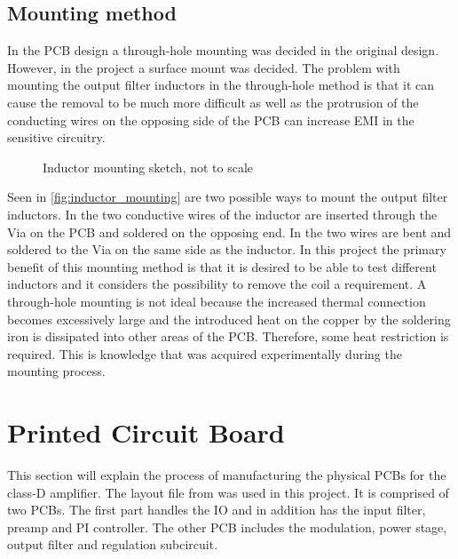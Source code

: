 \subsection{Mounting method}
In the PCB design a through-hole mounting was decided in the original design. However, in the project a surface mount was decided. The problem with mounting the output filter inductors in the through-hole method is that it can cause the removal to be much more difficult as well as the protrusion of the conducting wires on the opposing side of the PCB can increase EMI in the sensitive circuitry.

\begin{figure}[htbp]
	\centering
	\begin{subfigure}[t]{0.5\textwidth}
		\centering
		
		\label{fig:inductor_mount_thruhole}
	\end{subfigure}%
	\begin{subfigure}[t]{0.5\textwidth}
		\centering
		
		\label{fig:inductor_mount_surface}
	\end{subfigure}
	\caption{Inductor mounting sketch, not to scale}
	\label{fig:inductor_mounting}
\end{figure}

Seen in \autoref{fig:inductor_mounting} are two possible ways to mount the output filter inductors. In  the two conductive wires of the inductor are inserted through the Via on the PCB and soldered on the opposing end. In  the two wires are bent and soldered to the Via on the same side as the inductor. In this project the primary benefit of this mounting method is that it is desired to be able to test different inductors and it considers the possibility to remove the coil a requirement. A through-hole mounting is not ideal because the increased thermal connection becomes excessively large and the introduced heat on the copper by the soldering iron is dissipated into other areas of the PCB. Therefore, some heat restriction is required. This is knowledge that was acquired experimentally during the mounting process.

\section{Printed Circuit Board}
This section will explain the process of manufacturing the physical PCBs for the class-D amplifier. The layout file from \cite{nagy_special_course} was used in this project. It is comprised of two PCBs. The first part handles the IO and in addition has the input filter, preamp and PI controller. The other PCB includes the modulation, power stage, output filter and regulation subcircuit. \\

